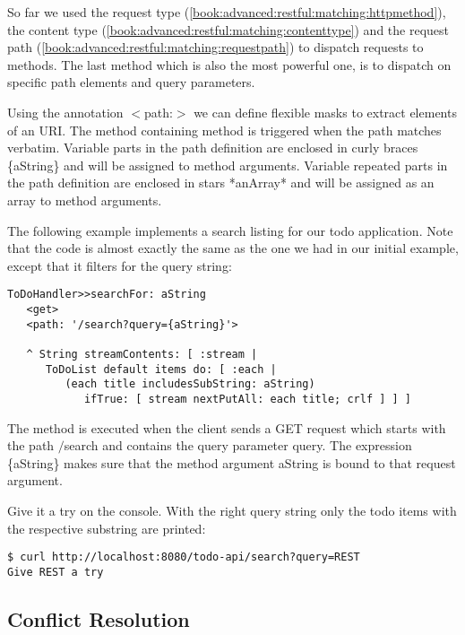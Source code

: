 \documentclass[a4paper,10pt,twoside]{book}
\newcommand{\ct}[1]{{\small\ttfamily\textup{#1}}}
\begin{document}
So far we used the request type (\autoref{book:advanced:restful:matching:httpmethod}), the content type (\autoref{book:advanced:restful:matching:contenttype}) and the request path (\autoref{book:advanced:restful:matching:requestpath}) to dispatch requests to methods. The last method which is also the most powerful one, is to dispatch on specific path elements and query parameters.

Using the annotation \ct{$<$path:$>$} we can define flexible masks to extract elements of an URI. The method containing method is triggered when the path matches verbatim. Variable parts in the path definition are enclosed in curly braces \ct{\{aString\}} and will be assigned to method arguments. Variable repeated parts in the path definition are enclosed in stars \ct{*anArray*} and will be assigned as an array to method arguments.

The following example implements a search listing for our todo application. Note that the code is almost exactly the same as the one we had in our initial example, except that it filters for the query string:

\begin{lstlisting}
ToDoHandler>>searchFor: aString
   <get>
   <path: '/search?query={aString}'>

   ^ String streamContents: [ :stream |
      ToDoList default items do: [ :each |
         (each title includesSubString: aString)
            ifTrue: [ stream nextPutAll: each title; crlf ] ] ]
\end{lstlisting}

The method is executed when the client sends a GET request which starts with the path \ct{$/$search} and contains the query parameter \ct{query}. The expression \ct{\{aString\}} makes sure that the method argument \ct{aString} is bound to that request argument.

Give it a try on the console. With the right query string only the todo items with the respective substring are printed:

\begin{lstlisting}
$ curl http://localhost:8080/todo-api/search?query=REST
Give REST a try
\end{lstlisting}

\subsection{Conflict Resolution}
\label{book:advanced:restful:matching:priorities}
\end{document}
